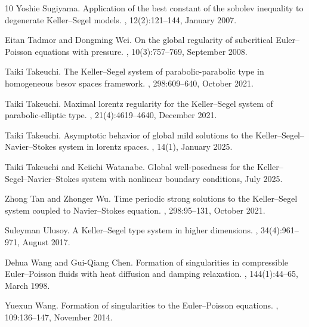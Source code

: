 \documentclass[11pt]{article}
\theoremstyle{plain}
\theoremstyle{definition}
\theoremstyle{remark}
\numberwithin{equation}{section}
\begin{document}
\begin{thebibliography}{10}
Yoshie Sugiyama.
\newblock Application of the best constant of the sobolev inequality to degenerate Keller--Segel models.
, 12(2):121--144, January 2007.

Eitan Tadmor and Dongming Wei.
\newblock On the global regularity of subcritical Euler--Poisson equations with pressure.
, 10(3):757--769, September 2008.

Taiki Takeuchi.
\newblock The Keller--Segel system of parabolic-parabolic type in homogeneous besov spaces framework.
, 298:609--640, October 2021.

Taiki Takeuchi.
\newblock Maximal lorentz regularity for the Keller--Segel system of parabolic-elliptic type.
, 21(4):4619--4640, December 2021.

Taiki Takeuchi.
\newblock Asymptotic behavior of global mild solutions to the Keller--Segel--Navier--Stokes system in lorentz spaces.
, 14(1), January 2025.

Taiki Takeuchi and Keiichi Watanabe.
\newblock Global well-posedness for the Keller--Segel--Navier--Stokes system with nonlinear boundary conditions, July 2025.

Zhong Tan and Zhonger Wu.
\newblock Time periodic strong solutions to the Keller--Segel system coupled to Navier--Stokes equation.
, 298:95--131, October 2021.

Suleyman Ulusoy.
\newblock A Keller--Segel type system in higher dimensions.
, 34(4):961--971, August 2017.

Dehua Wang and Gui-Qiang Chen.
\newblock Formation of singularities in compressible Euler--Poisson fluids with heat diffusion and damping relaxation.
, 144(1):44--65, March 1998.

Yuexun Wang.
\newblock Formation of singularities to the Euler--Poisson equations.
, 109:136--147, November 2014.


\end{thebibliography}
\end{document}
